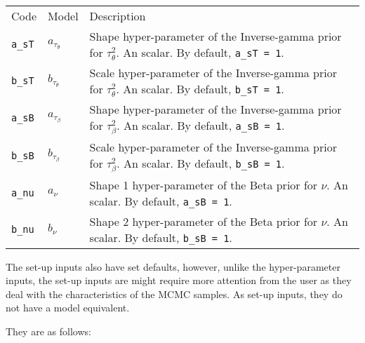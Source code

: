 \documentclass[
]{article}
\begin{document}
\begin{longtable}[]{@{}
  >{\raggedleft\arraybackslash}p{}
  >{\centering\arraybackslash}p{}
  >{\raggedright\arraybackslash}p{}@{}}
\toprule\noalign{}
\endhead
\bottomrule\noalign{}
\endlastfoot
Code & Model & Description \\
\texttt{a\_sT} & \(a_{\tau_\theta}\) & Shape hyper-parameter of the Inverse-gamma prior for
\(\tau_\theta^2\). An scalar. By default, \texttt{a\_sT\ =\ 1}. \\
\texttt{b\_sT} & \(b_{\tau_\theta}\) & Scale hyper-parameter of the Inverse-gamma prior for
\(\tau_\theta^2\). An scalar. By default, \texttt{b\_sT\ =\ 1}. \\
\texttt{a\_sB} & \(a_{\tau_\beta}\) & Shape hyper-parameter of the Inverse-gamma prior for
\(\tau_\beta^2\). An scalar. By default, \texttt{a\_sB\ =\ 1}. \\
\texttt{b\_sB} & \(b_{\tau_\beta}\) & Scale hyper-parameter of the Inverse-gamma prior for
\(\tau_\beta^2\). An scalar. By default, \texttt{b\_sB\ =\ 1}. \\
\texttt{a\_nu} & \(a_{\nu}\) & Shape 1 hyper-parameter of the Beta prior for
\(\nu\). An scalar. By default, \texttt{a\_sB\ =\ 1}. \\
\texttt{b\_nu} & \(b_{\nu}\) & Shape 2 hyper-parameter of the Beta prior for
\(\nu\). An scalar. By default, \texttt{b\_sB\ =\ 1}. \\
\end{longtable}

The set-up inputs also have set defaults, however, unlike the hyper-parameter
inputs, the set-up inputs are might require more attention from the user as
they deal with the characteristics of the MCMC samples. As set-up inputs,
they do not have a model equivalent.

They are as follows:
\end{document}
